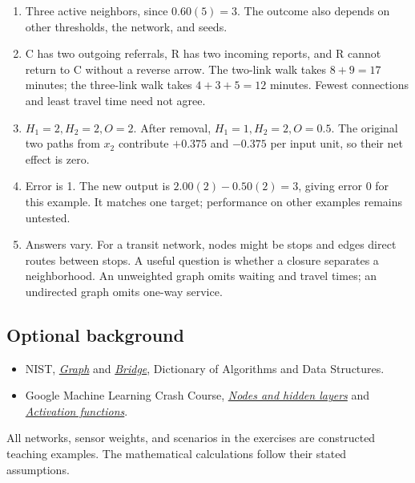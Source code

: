 \documentclass[11pt,letterpaper]{article}
\begin{document}
{\begin{enumerate}
\item Three active neighbors, since $0.60(5)=3$. The outcome also depends on other thresholds, the network, and seeds.
\item C has two outgoing referrals, R has two incoming reports, and R cannot return to C without a reverse arrow. The two-link walk takes $8+9=17$ minutes; the three-link walk takes $4+3+5=12$ minutes. Fewest connections and least travel time need not agree.
\item $H_1=2,H_2=2,O=2$. After removal, $H_1=1,H_2=2,O=0.5$. The original two paths from $x_2$ contribute $+0.375$ and $-0.375$ per input unit, so their net effect is zero.
\item Error is 1. The new output is $2.00(2)-0.50(2)=3$, giving error 0 for this example. It matches one target; performance on other examples remains untested.
\item Answers vary. For a transit network, nodes might be stops and edges direct routes between stops. A useful question is whether a closure separates a neighborhood. An unweighted graph omits waiting and travel times; an undirected graph omits one-way service.
\end{enumerate}
\subsection*{Optional background}
\begin{itemize}
\item NIST, \href{https://xlinux.nist.gov/dads/HTML/graph.html}{\emph{Graph}} and \href{https://xlinux.nist.gov/dads/HTML/bridge.html}{\emph{Bridge}}, Dictionary of Algorithms and Data Structures.
\item Google Machine Learning Crash Course, \href{https://developers.google.com/machine-learning/crash-course/neural-networks/nodes-hidden-layers}{\emph{Nodes and hidden layers}} and \href{https://developers.google.com/machine-learning/crash-course/neural-networks/activation-functions}{\emph{Activation functions}}.
\end{itemize}
All networks, sensor weights, and scenarios in the exercises are constructed teaching examples. The mathematical calculations follow their stated assumptions.
}
\end{document}
